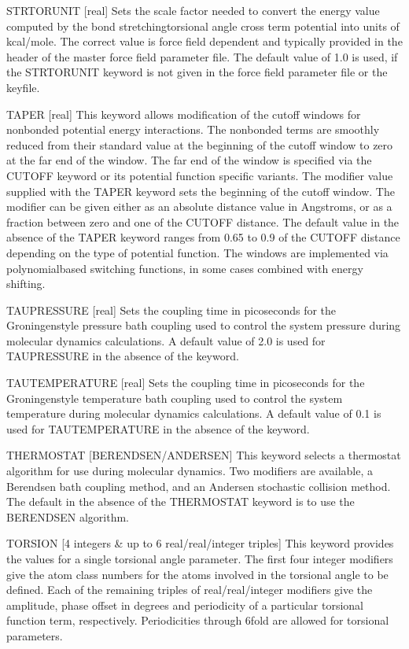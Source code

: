 \documentclass[letterpaper,11pt,english]{sphinxmanual}
\begin{document}
STRTORUNIT {[}real{]}     Sets the scale factor needed to convert the energy value computed by the bond stretching\sphinxhyphen{}torsional angle cross term potential into units of kcal/mole. The correct value is force field dependent and typically provided in the header of the master force field parameter file. The default value of 1.0 is used, if the STRTORUNIT keyword is not given in the force field parameter file or the keyfile.

TAPER {[}real{]}     This keyword allows modification of the cutoff windows for nonbonded potential energy interactions. The nonbonded terms are smoothly reduced from their standard value at the beginning of the cutoff window to zero at the far end of the window. The far end of the window is specified via the CUTOFF keyword or its potential function specific variants. The modifier value supplied with the TAPER keyword sets the beginning of the cutoff window. The modifier can be given either as an absolute distance value in Angstroms, or as a fraction between zero and one of the CUTOFF distance. The default value in the absence of the TAPER keyword ranges from 0.65 to 0.9 of the CUTOFF distance depending on the type of potential function. The windows are implemented via polynomial\sphinxhyphen{}based switching functions, in some cases combined with energy shifting.

TAU\sphinxhyphen{}PRESSURE {[}real{]}     Sets the coupling time in picoseconds for the Groningen\sphinxhyphen{}style pressure bath coupling used to control the system pressure during molecular dynamics calculations. A default value of 2.0 is used for TAU\sphinxhyphen{}PRESSURE in the absence of the keyword.

TAU\sphinxhyphen{}TEMPERATURE {[}real{]}     Sets the coupling time in picoseconds for the Groningen\sphinxhyphen{}style temperature bath coupling used to control the system temperature during molecular dynamics calculations. A default value of 0.1 is used for TAU\sphinxhyphen{}TEMPERATURE in the absence of the keyword.

THERMOSTAT {[}BERENDSEN/ANDERSEN{]}     This keyword selects a thermostat algorithm for use during molecular dynamics. Two modifiers are available, a Berendsen bath coupling method, and an Andersen stochastic collision method. The default in the absence of the THERMOSTAT keyword is to use the BERENDSEN algorithm.

TORSION {[}4 integers \& up to 6 real/real/integer triples{]}     This keyword provides the values for a single torsional angle parameter. The first four integer modifiers give the atom class numbers for the atoms involved in the torsional angle to be defined. Each of the remaining triples of real/real/integer modifiers give the amplitude, phase offset in degrees and periodicity of a particular torsional function term, respectively. Periodicities through 6\sphinxhyphen{}fold are allowed for torsional parameters.
\end{document}
